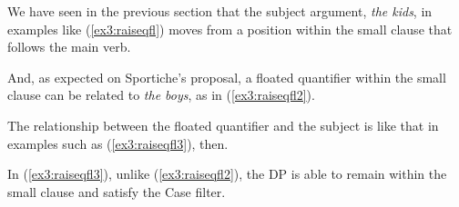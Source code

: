 We have seen in the previous section that the subject argument, \emph{the kids}, in examples like (\ref{ex3:raiseqfl}) moves from a position within the small clause that follows the main verb.
\begin{exe}
\ex \label{ex3:raiseqfl} 
\begin{xlist}
\end{xlist}
\end{exe}
And, as expected on Sportiche's proposal, a floated quantifier within the small clause can be related to \emph{the boys}, as in (\ref{ex3:raiseqfl2}).
\begin{exe}
\ex \label{ex3:raiseqfl2} 
\begin{xlist}
\end{xlist}
\end{exe}
The relationship between the floated quantifier and the subject is like that in examples such as (\ref{ex3:raiseqfl3}), then.
\begin{exe}
\ex \label{ex3:raiseqfl3} 
\begin{xlist}
\end{xlist}
\end{exe}
In (\ref{ex3:raiseqfl3}), unlike (\ref{ex3:raiseqfl2}), the DP is able to remain within the small clause and satisfy the Case filter.

